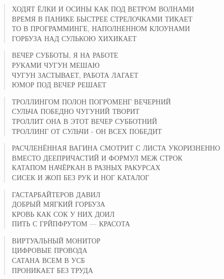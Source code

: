 \poemtitle{***}
\begin{verse}
ХОДЯТ ЁЛКИ И ОСИНЫ КАК ПОД ВЕТРОМ ВОЛНАМИ\\
ВРЕМЯ В ПАНИКЕ БЫСТРЕЕ СТРЕЛОЧКАМИ ТИКАЕТ\\
ТО В ПРОГРАММИНГЕ, НАПОЛНЕННОМ КЛОУНАМИ\\
ГОРБУЗА НАД СУЛЬКОЮ ХИХИКАЕТ
\end{verse}

\poemtitle{***}
\begin{verse}
ВЕЧЕР СУББОТЫ, Я НА РАБОТЕ\\
РУКАМИ ЧУГУН МЕШАЮ\\
ЧУГУН ЗАСТЫВАЕТ, РАБОТА ЛАГАЕТ\\
ЮМОР ПОД ВЕЧЕР РЕШАЕТ
\end{verse}

\poemtitle{***}
\begin{verse}
ТРОЛЛИНГОМ ПОЛОН ПОГРОМЕНГ ВЕЧЕРНИЙ\\
СУЛЬЧА ПОБЕДНО ЧУГУНИЙ ТВОРИТ\\
ТРОЛЛИТ ОНА В ЭТОТ ВЕЧЕР СУББОТНИЙ\\
ТРОЛЛИНГ ОТ СУЛЬЧИ - ОН ВСЕХ ПОБЕДИТ
\end{verse}

\poemtitle{***}
\begin{verse}
РАСЧЛЕНЁННАЯ ВАГИНА СМОТРИТ С ЛИСТА УКОРИЗНЕННО\\
ВМЕСТО ДЕЕПРИЧАСТИЙ И ФОРМУЛ МЕЖ СТРОК\\
КАТАПОМ НАЧЁРКАН В РАЗНЫХ РАКУРСАХ\\
СИСЕК И ЖОП БЕЗ РУК И НОГ КАТАЛОГ
\end{verse}

\poemtitle{***}
\begin{verse}
ГАСТАРБАЙТЕРОВ ДАВИЛ\\
ДОБРЫЙ МЯГКИЙ ГОРБУЗА\\
КРОВЬ КАК СОК У НИХ ДОИЛ\\
ПИТЬ С ГРЙПФРУТОМ — КРАСОТА
\end{verse}

\poemtitle{***}
\begin{verse}
ВИРТУАЛЬНЫЙ МОНИТОР\\
ЦИФРОВЫЕ ПРОВОДА\\
САТАНА ВСЕМ В УСБ\\
ПРОНИКАЕТ БЕЗ ТРУДА
\end{verse}

